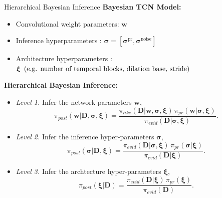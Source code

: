 \documentclass[8pt,xcolor=dvipsnames,compress]{beamer}
\begin{document}
\begin{frame}{Hierarchical Bayesian Inference}
\textbf{Bayesian TCN Model:}
\begin{itemize}
    \item Convolutional weight parameters: $\boldsymbol w $
    \item Inference hyperparameters \hspace{0.17 in}: $\boldsymbol \sigma = [\boldsymbol \sigma^{\text{pr}}, \boldsymbol \sigma^{\text{noise}}]$
    \item Architecture hyperparameters \hspace{0.02 in}: $\boldsymbol \xi \hspace{0.07 in} (\text{e.g. number of temporal blocks, dilation base, stride)} $
\end{itemize}
    \textbf{{Hierarchical Bayesian Inference:\footnotemark}}
\begin{itemize}
    \item \textit{Level 1.} Infer the network parameters $\boldsymbol w$,
    \begin{equation*}\label{eq:lev1}
    \pi_{post} (\boldsymbol w | \boldsymbol D, \boldsymbol \sigma, \boldsymbol \xi) = 
    \frac{\pi_{like} (\boldsymbol D| \boldsymbol w, \boldsymbol \sigma, \boldsymbol \xi) \,
    \pi_{pr} (\boldsymbol w| \boldsymbol \sigma, \boldsymbol \xi)}
    {\pi_{evid} (\boldsymbol D| \boldsymbol \sigma, \boldsymbol \xi)}.
    \end{equation*}


    \item \textit{Level 2.} Infer the inference hyper-parameters $\boldsymbol \sigma$,
    \begin{equation*}\label{eq:lev2}
    \pi_{post} (\boldsymbol \sigma | \boldsymbol D,  \boldsymbol \xi) = 
    \frac{\pi_{evid} (\boldsymbol D| \boldsymbol \sigma,  \boldsymbol \xi) \,
    \pi_{pr} (\boldsymbol \sigma |  \boldsymbol \xi)}
    {\pi_{evid} (\boldsymbol D|  \boldsymbol \xi)}.
    \end{equation*}


    \item \textit{Level 3.} Infer the archtecture hyper-parameters $\boldsymbol \xi$,
    \begin{equation*}\label{eq:lev3}
    \pi_{post} (\boldsymbol \xi | \boldsymbol D) =
    \frac{\pi_{evid} (\boldsymbol D| \boldsymbol \xi) \,
    \pi_{pr} (\boldsymbol \xi)}{\pi_{evid} (\boldsymbol D)}.
    \end{equation*}

\end{itemize}
\end{frame}
\end{document}
